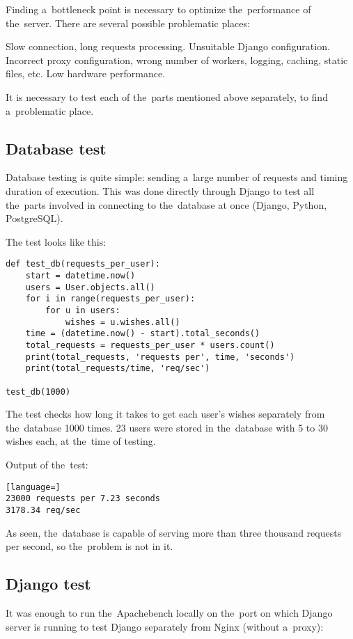 Finding a~bottleneck point is necessary to optimize the~performance of the~server. There are several possible
problematic places:
\pagebreak

\begin{itemize}
 Slow connection, long requests processing.
 Unsuitable Django configuration.
 Incorrect proxy configuration, wrong number of workers, logging, caching, static files, etc.
 Low hardware performance.
\end{itemize}

It is necessary to test each of the~parts mentioned above separately, to find a~problematic place.

\subsection{Database test}
Database testing is quite simple: sending a~large number of requests and timing duration of execution. This was done directly through Django to test all the~parts involved in connecting to the~database at once (Django, Python, PostgreSQL).

The test looks like this:

\begin{lstlisting}
def test_db(requests_per_user):
    start = datetime.now()
    users = User.objects.all()
    for i in range(requests_per_user):
        for u in users:
            wishes = u.wishes.all()
    time = (datetime.now() - start).total_seconds()
    total_requests = requests_per_user * users.count()
    print(total_requests, 'requests per', time, 'seconds')
    print(total_requests/time, 'req/sec')

test_db(1000)
\end{lstlisting}

The test checks how long it takes to get each user's wishes separately from the~database 1000 times. 23 users were
stored in the~database with 5 to 30 wishes each, at the~time of testing.

Output of the~test:

\begin{lstlisting}[language=]
23000 requests per 7.23 seconds
3178.34 req/sec
\end{lstlisting}

As seen, the~database is capable of serving more than three thousand requests per second, so the~problem is not in it.
\pagebreak

\subsection{Django test}
It was enough to run the~Apachebench locally on the~port on which Django server is running to test Django separately
from Nginx (without a~proxy):

